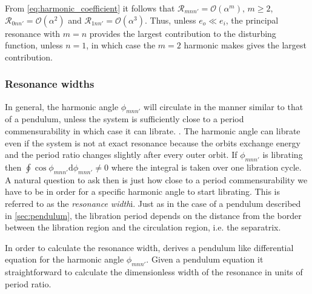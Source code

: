From \cref{eq:harmonic_coefficient} it follows that $\mathcal{R}
_{mnn'}=\mathcal{O}(\alpha^m),\,m\geq 2$, $\mathcal{R}_{0nn'}=
\mathcal{O}(\alpha^2)$ and $\mathcal{R}_{1nn'}=\mathcal{O}(
\alpha^3)$. Thus, unless $e_o\ll e_i$, the principal resonance
with $m=n$ provides the largest contribution to the disturbing
function, unless $n=1$, in which case the $m=2$ harmonic makes
gives the largest contribution.
\subsubsection{Resonance widths}
\label{ssub:Resonance_widths}
In general, the harmonic angle $\phi_{mnn'}$ will circulate in the
manner similar to that of a pendulum, unless the system is 
sufficiently close to a period commensurability in which case
it can librate. 
. The harmonic angle
can librate even if the system is not at exact resonance
because the orbits exchange energy and the period ratio changes
slightly after every outer orbit. If $\phi_{mnn'}$ is librating
 then $\oint\cos\phi_{mnn'}\mathrm{d}\phi_{mnn'}\neq 0$ where the
integral is taken over one libration cycle. A natural 
question to ask then is just how close to a period commensurability
we have to be in order for a specific harmonic angle to start
librating. This is referred to as the \emph{resonance width}i. 
Just as in the case of a pendulum described in 
\cref{sec:pendulum}, the libration period 
depends on the distance from the border between the libration region
and the circulation region, i.e. the separatrix.  

In order to calculate the resonance width, \cite{Mardling2013} derives
a pendulum like differential equation for the harmonic angle $\phi_{mnn'}$.
Given a pendulum equation it straightforward to calculate the dimensionless
width of the resonance in units of period ratio.

